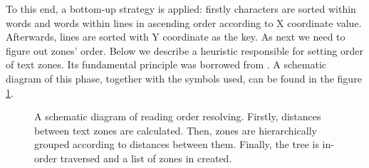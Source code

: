 To this end, a bottom-up strategy is applied: firstly characters are sorted within words and words within lines in ascending order according to X coordinate value. Afterwards, lines are sorted with Y coordinate as the key. As next we need to figure out zones' order. Below we describe a heuristic responsible for setting order of text zones. Its fundamental principle was borrowed from \cite{Agrawal2009}. A schematic diagram of this phase, together with the symbols used, can be found in the figure \ref{fig:reading_order}.
\begin{figure}[ht]
  \centering
  
  \caption{A schematic diagram of reading order resolving. Firstly, distances between text zones are calculated. Then, zones are hierarchically grouped according to distances between them. Finally, the tree is in-order traversed and a list of zones in created.}
  \label{fig:reading_order}
\end{figure}
